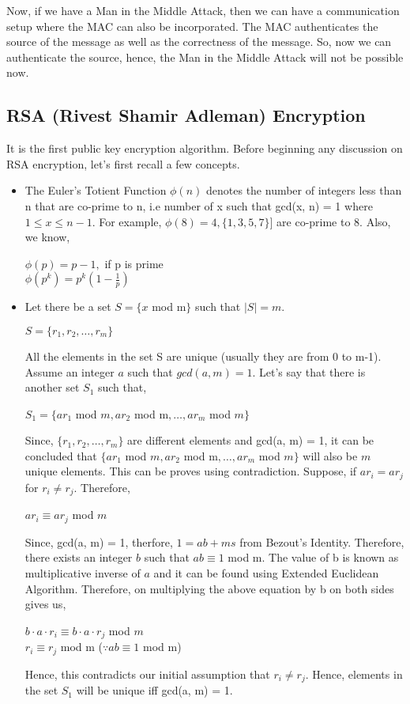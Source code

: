 \documentclass[11pt]{article}
\begin{document}
Now, if we have a Man in the Middle Attack, then we can have a communication setup where the MAC can also be incorporated. The MAC authenticates the source of the message as well as the correctness of the message. So, now we can authenticate the source, hence, the Man in the Middle Attack will not be possible now.

\subsection{RSA (Rivest Shamir Adleman) Encryption}
It is the first public key encryption algorithm. Before beginning any discussion on RSA encryption, let's first recall a few concepts.
\begin{itemize}
    \item The Euler's Totient Function $\phi(n)$ denotes the number of integers less than n that are co-prime to n, i.e number of x such that gcd(x, n) = 1 where $1 \leq x \leq n-1$. For example, $\phi(8) = 4, \{1, 3,5,7\}]$ are co-prime to 8. Also, we know,
    \begin{center}
        $\phi(p) = p-1,$ if p is prime\\
        \vspace{1mm}
        $\phi(p^k) = p^k(1 - \frac{1}{p})$
    \end{center}
    \item Let there be a set $S = \{x$ mod m$\}$ such that $|S| = m$.
    \begin{center}
        $S = \{r_1, r_2,\hdots, r_m\}$
    \end{center}
    All the elements in the set S are unique (usually they are from 0 to m-1). Assume an integer $a$ such that $gcd(a, m) = 1$. Let's say that there is another set $S_1$ such that,
    \begin{center}
        $S_1 = \{ar_1$ mod $m, ar_2$ mod m$,\hdots, ar_m$ mod $m\}$
    \end{center}
    Since, $\{r_1, r_2,\hdots, r_m\}$ are different elements and gcd(a, m) = 1, it can be concluded that $\{ar_1$ mod $m, ar_2$ mod m$,\hdots, ar_m$ mod $m\}$ will also be $m$ unique elements. This can be proves using contradiction. Suppose, if $ar_i = ar_j$ for $r_i \neq r_j$. Therefore,
    \begin{center}
        $ar_i \equiv ar_j$ mod $m$
    \end{center}
    Since, gcd(a, m) = 1, therfore, $1 = ab + ms$ from Bezout's Identity. Therefore, there exists an integer $b$ such that $ab \equiv 1$ mod m. The value of b is known as multiplicative inverse of $a$ and it can be found using Extended Euclidean Algorithm.
    Therefore, on multiplying the above equation by b on both sides gives us,
    \begin{center}
        $b\cdot a\cdot r_i \equiv b\cdot a \cdot r_j$ mod $m$\\
        $r_i \equiv r_j$ mod m    ($\because ab \equiv 1$ mod m)
    \end{center}
    Hence, this contradicts our initial assumption that $r_i \neq r_j$. Hence, elements in the set $S_1$ will be unique iff gcd(a, m) = 1.
\end{itemize}
\end{document}
